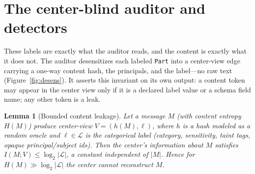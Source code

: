 \documentclass{article}
\newtheorem{lemma}{Lemma}
\begin{document}
\section{The center-blind auditor and detectors}\label{sec:auditor}
These labels are exactly what the auditor reads, and the content is exactly what
it does not. The auditor desensitizes each labeled \texttt{Part} into a
center-view edge carrying a one-way content hash, the principals, and the
label---no raw text (Figure~\ref{fig:desens}). It
asserts this invariant on its own output: a content token may appear in the center
view only if it is a declared label value or a schema field name; any other token
is a leak.

\begin{lemma}[Bounded content leakage]\label{lem:blind}
Let a message $M$ (with content entropy $H(M)$) produce center-view
$V=(h(M),\ell)$, where $h$ is a hash modeled as a random oracle and
$\ell\in\mathcal{L}$ is the categorical label (category, sensitivity, taint tags,
opaque principal/subject ids). Then the center's information about $M$ satisfies
$I(M;V)\le \log_2|\mathcal{L}|$, a constant independent of $|M|$. Hence for
$H(M)\gg\log_2|\mathcal{L}|$ the center cannot reconstruct $M$.
\end{lemma}


\end{document}
